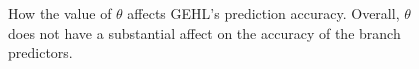 \begin{figure}[h]

  \caption{How the value of $\theta$ affects GEHL's prediction accuracy.  Overall, $\theta$ does not have a substantial affect on the accuracy of the branch predictors.}
  \label{fig:theta}
\end{figure}



